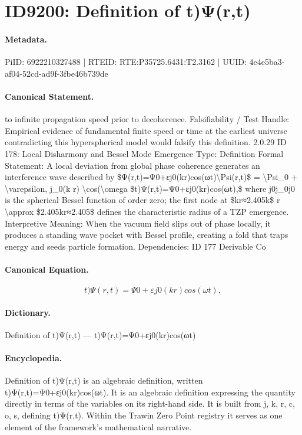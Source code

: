 \section*{ID9200: Definition of t)Ψ(r,t)}
\paragraph{Metadata.}
PiID: 6922210327488 | RTEID: RTE:P35725.6431:T2.3162 | UUID: 4e4e5ba3-af04-52cd-ad9f-3fbe46b739de

\paragraph{Canonical Statement.}
to infinite propagation speed prior to decoherence. Falsifiability / Test Handle: Empirical evidence of fundamental finite speed or time at the earliest universe contradicting this hyperspherical model would falsify this definition. 2.0.29 ID 178: Local Disharmony and Bessel Mode Emergence Type: Definition Formal Statement: A local deviation from global phase coherence generates an interference wave described by \$Ψ(r,t)=Ψ0+εj0(kr)cos(ωt)\textbackslash{}Psi(r,t)\$ = \textbackslash{}Psi\_0 + \textbackslash{}varepsilon, j\_0(k r) \textbackslash{}cos(\textbackslash{}omega \$t)Ψ(r,t)=Ψ0+εj0(kr)cos(ωt),\$ where j0j\_0j0 is the spherical Bessel function of order zero; the first node at \$kr≈2.405k\$ r \textbackslash{}approx \$2.405kr≈2.405\$ defines the characteristic radius of a TZP emergence. Interpretive Meaning: When the vacuum field slips out of phase locally, it produces a standing wave pocket with Bessel profile, creating a fold that traps energy and seeds particle formation. Dependencies: ID 177 Derivable Co

\paragraph{Canonical Equation.}
\[
t)Ψ(r,t)=Ψ0+εj0(kr)cos(ωt),
\]

\paragraph{Dictionary.}
Definition of t)Ψ(r,t) — t)Ψ(r,t)=Ψ0+εj0(kr)cos(ωt)

\paragraph{Encyclopedia.}
Definition of t)Ψ(r,t) is an algebraic definition, written t)Ψ(r,t)=Ψ0+εj0(kr)cos(ωt). It is an algebraic definition expressing the quantity directly in terms of the variables on its right-hand side. It is built from j, k, r, c, o, s, defining t)Ψ(r,t). Within the Trawin Zero Point registry it serves as one element of the framework's mathematical narrative.
